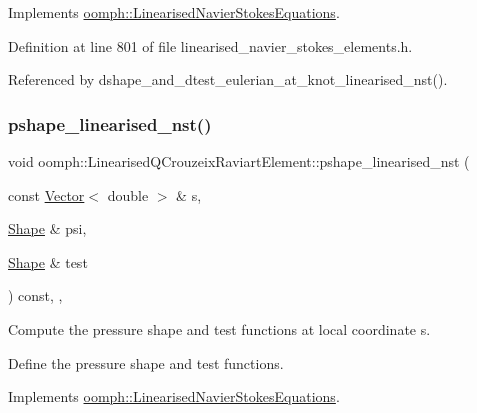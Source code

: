 Implements \hyperlink{classoomph_1_1LinearisedNavierStokesEquations_a6158d0cdb646491170e4b75abfc88538}{oomph\+::\+Linearised\+Navier\+Stokes\+Equations}.



Definition at line 801 of file linearised\+\_\+navier\+\_\+stokes\+\_\+elements.\+h.



Referenced by dshape\+\_\+and\+\_\+dtest\+\_\+eulerian\+\_\+at\+\_\+knot\+\_\+linearised\+\_\+nst().

\mbox{\label{classoomph_1_1LinearisedQCrouzeixRaviartElement_ac159b94150d8c3ac032cc6be6ed579b1}} 
\subsubsection{\texorpdfstring{pshape\+\_\+linearised\+\_\+nst()}{pshape\_linearised\_nst()}\hspace{0.1cm}{\footnotesize\ttfamily [2/2]}}
{\footnotesize\ttfamily void oomph\+::\+Linearised\+Q\+Crouzeix\+Raviart\+Element\+::pshape\+\_\+linearised\+\_\+nst (\begin{DoxyParamCaption}\item[{const \hyperlink{classoomph_1_1Vector}{Vector}$<$ double $>$ \&}]{s,  }\item[{\hyperlink{classoomph_1_1Shape}{Shape} \&}]{psi,  }\item[{\hyperlink{classoomph_1_1Shape}{Shape} \&}]{test }\end{DoxyParamCaption}) const\hspace{0.3cm}{\ttfamily [inline]}, {\ttfamily [protected]}, {\ttfamily [virtual]}}



Compute the pressure shape and test functions at local coordinate s. 

Define the pressure shape and test functions. 

Implements \hyperlink{classoomph_1_1LinearisedNavierStokesEquations_a10130c3d5e96459201ef87b196427c60}{oomph\+::\+Linearised\+Navier\+Stokes\+Equations}.



